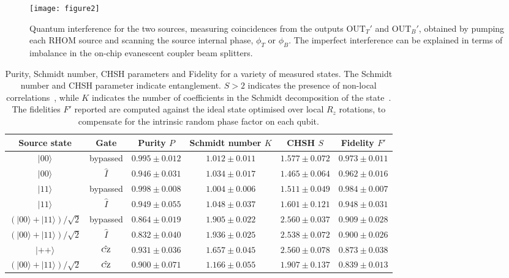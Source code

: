 \documentclass[
twocolumn,
 amsmath,amssymb,
 aps,
  twoside,
 superscriptaddress,
pra,
longbibliography
]{revtex4-1}
\begin{document}
\begin{figure}[tbh!]
\centering
\texttt{[image: figure2]}
\caption{Quantum interference for the two sources, measuring coincidences from the outputs $\mathrm{OUT}_T'$ and $\mathrm{OUT}_B'$, obtained by pumping each RHOM source and scanning the source internal phase, $\phi_T$ or $\phi_B$. The imperfect interference can be explained in terms of imbalance in the on-chip evanescent coupler beam splitters.}
\label{figure2}
\end{figure}





\begin{table*}[bt!]
\centering
\begin{tabular}{cc|cccc}
\textbf{Source state} & \textbf{Gate} & \textbf{Purity} $P$	& \textbf{Schmidt number} $K$  &	\textbf{CHSH} $S$ &	\textbf{Fidelity} $F'$\\
\hline
 \rule{0pt}{4mm}%
 $|00\rangle$ & {bypassed} & $0.995 \pm 0.012 $  & $1.012 \pm 0.011$   & $1.577\pm 0.072$  & $0.973 \pm 0.011$ \\
 $|00\rangle$ & {$\hat{I}$} & $0.946 \pm 0.031 $ & $1.034 \pm 0.017 $ &  $1.465 \pm0.064 $ & $0.962 \pm 0.016$\\
 \rule{0pt}{5mm}%
 $|11\rangle$ & {bypassed} & $0.998 \pm 0.008$ & $1.004 \pm 0.006 $ & $1.511 \pm 0.049$ & $0.984 \pm 0.007 $\\
 $|11\rangle$ & {$\hat{I}$} & $0.949 \pm 0.055 $ & $1.048\pm 0.037 $ & $1.601 \pm 0.121$ & $0.948 \pm 0.031$ \\
 \rule{0pt}{5mm}%
 $(|00\rangle + |11\rangle)/\sqrt{2}$ & {bypassed} & $0.864 \pm0.019$ & $1.905 \pm 0.022 $ &  $2.560 \pm 0.037$  & $0.909 \pm 0.028 $\\
 $(|00\rangle + |11\rangle)/\sqrt{2}$ & {$\hat{I}$} & $0.832 \pm 0.040$ & $1.936\pm 0.025$  & $2.538\pm0.072$ & $0.900 \pm 0.026$\\
 \rule{0pt}{5mm}%
 $|++\rangle$ & {$\hat{\textsc{cz}}$} & $0.931 \pm0.036$ & $1.657 \pm 0.045 $ & $2.560 \pm 0.078$ & $0.873 \pm 0.038$  \\
 $(|00\rangle + |11\rangle)/\sqrt{2}$ & {$\hat{\textsc{cz}}$} & $0.900 \pm 0.071$ & $1.166 \pm 0.055 $&  $1.907 \pm 0.137$ &  $0.839 \pm 0.013$
\end{tabular}
\caption{Purity, Schmidt number, CHSH parameters and Fidelity for a variety of measured states. The Schmidt number and CHSH parameter indicate entanglement. $S > 2$ indicates the presence of non-local correlations~\cite{Horodecki:2009gb}, while $K$ indicates the number of coefficients in the Schmidt decomposition of the state~\cite{Terhal:2000gd}. The fidelities $F'$ reported are computed against the ideal state optimised over local $R_z$ rotations, to compensate for the intrinsic random phase factor on each qubit.}\label{table:data}
\end{table*}
\end{document}
